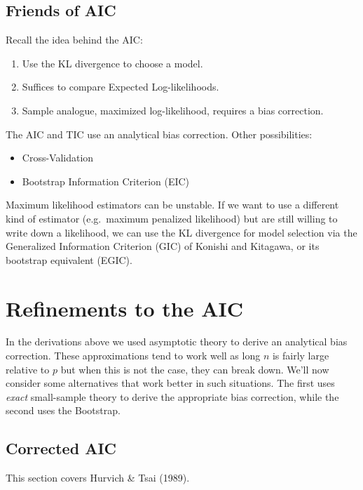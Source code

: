 \documentclass[12pt]{article}
\theoremstyle{definition}
\begin{document}
\subsection{Friends of AIC}
Recall the idea behind the AIC:
	\begin{enumerate}
		\item Use the KL divergence to choose a model.
		\item Suffices to compare Expected Log-likelihoods. 
		\item Sample analogue, maximized log-likelihood, requires a bias correction.
	\end{enumerate}
The AIC and TIC use an analytical bias correction. Other possibilities:
	\begin{itemize}
		\item Cross-Validation
		\item Bootstrap Information Criterion (EIC)
	\end{itemize}
Maximum likelihood estimators can be unstable. If we want to use a different kind of estimator (e.g.\ maximum penalized likelihood) but are still willing to write down a likelihood, we can use the KL divergence for model selection via the Generalized Information Criterion (GIC) of Konishi and Kitagawa, or its bootstrap equivalent (EGIC).

\section{Refinements to the AIC}
In the derivations above we used asymptotic theory to derive an analytical bias correction. These approximations tend to work well as long $n$ is fairly large relative to $p$ but when this is not the case, they can break down. We'll now consider some alternatives that work better in such situations. The first uses \emph{exact} small-sample theory to derive the appropriate bias correction, while the second uses the Bootstrap.


\subsection{Corrected AIC}
This section covers Hurvich \& Tsai (1989).
\end{document}
